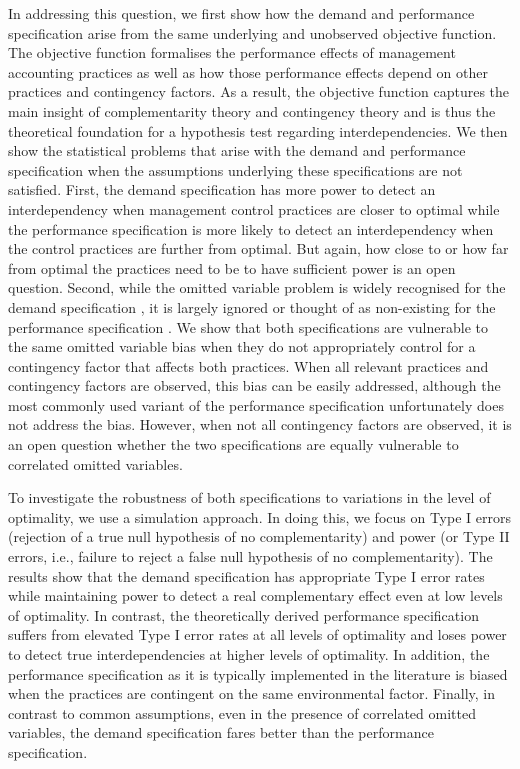 \documentclass[12pt]{article}
\begin{document}
In addressing this question, we first show how the demand and performance specification arise from the same underlying and unobserved objective function. The objective function formalises the performance effects of management accounting practices as well as how those performance effects depend on other practices and contingency factors. As a result, the objective function captures the main insight of complementarity theory \citep{milgrom_complementarities_1995,grabner_management_2013} and contingency theory \citep{chenhall_management_2003,otley_contingency_2016} and is thus the theoretical foundation for a hypothesis test regarding interdependencies. We then show the statistical problems that arise with the demand and performance specification when the assumptions underlying these specifications are not satisfied. First, the demand specification has more power to detect an interdependency when management control practices are closer to optimal while the performance specification is more likely to detect an interdependency when the control practices are further from optimal. But again, how close to or how far from optimal the practices need to be to have sufficient power is an open question. Second, while the omitted variable problem is widely recognised for the demand specification \citep{grabner_management_2013, arora_testing_1996, hofmann_organizational_2017}, it is largely ignored \citep{grabner_management_2013, hofmann_organizational_2017} or thought of as non-existing for the performance specification \citep{carree_note_2011}. We show that both specifications are vulnerable to the same omitted variable bias when they do not appropriately control for a contingency factor that affects both practices. When all relevant practices and contingency factors are observed, this bias can be easily addressed, although the most commonly used variant of the performance specification unfortunately does not address the bias. However, when not all contingency factors are observed, it is an open question whether the two specifications are equally vulnerable to correlated omitted variables.

To investigate the robustness of both specifications to variations in the level of optimality, we use a simulation approach. In doing this, we focus on Type I errors (rejection of a true null hypothesis of no complementarity) and power (or Type II errors, i.e., failure to reject a false null hypothesis of no complementarity). The results show that the demand specification has appropriate Type I error rates while maintaining power to detect a real complementary effect even at low levels of optimality. In contrast, the theoretically derived performance specification suffers from elevated Type I error rates at all levels of optimality and loses power to detect true interdependencies at higher levels of optimality. In addition, the performance specification as it is typically implemented in the literature is biased when the practices are contingent on the same environmental factor. Finally, in contrast to common assumptions, even in the presence of correlated omitted variables, the demand specification fares better than the performance specification.
\end{document}
